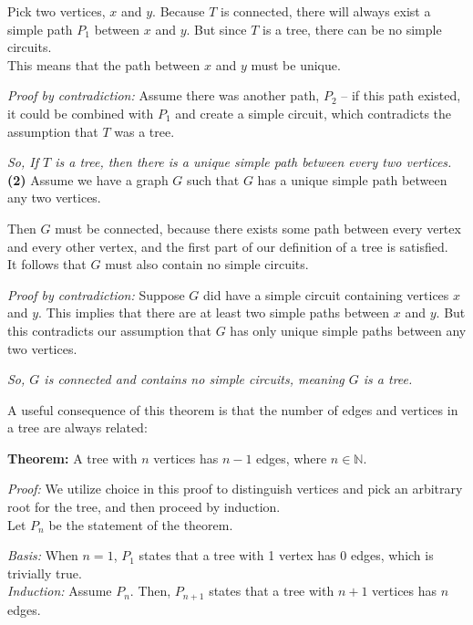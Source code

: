 \documentclass[a4paper,10pt]{report}
\begin{document}
Pick two vertices, $x$ and $y$.
Because $T$ is connected, there will always exist a simple path $P_1$ between $x$ and $y$.
But since $T$ is a tree, there can be no simple circuits. \\

This means that the path between $x$ and $y$ must be unique.

\textit{Proof by contradiction:}
Assume there was another path, $P_2$ -- if this path existed, it could be combined with $P_1$ and create a simple circuit, which contradicts the assumption that $T$ was a tree.

\textit{So, If $T$ is a tree, then there is a unique simple path between every two vertices.} \\

\textbf{(2)} Assume we have a graph $G$ such that $G$ has a unique simple path between any two vertices.

Then $G$ must be connected, because there exists some path between every vertex and every other vertex, and the first part of our definition of a tree is satisfied. \\

It follows that $G$ must also contain no simple circuits.

\textit{Proof by contradiction:}
Suppose $G$ did have a simple circuit containing vertices $x$ and $y$. This implies that there are at least two simple paths between $x$ and $y$. But this contradicts our assumption that $G$ has only unique simple paths between any two vertices.

\textit{So, $G$ is connected and contains no simple circuits, meaning $G$ is a tree.}

\hrulefill

A useful consequence of this theorem is that the number of edges and vertices in a tree are always related:

\textbf{Theorem:} A tree with $n$ vertices has $n-1$ edges, where $n\in\mathbb{N}$.

\textit{Proof: }We utilize choice in this proof to distinguish vertices and pick an arbitrary root for the tree, and then proceed by induction. \\

Let $P_n$ be the statement of the theorem.

\textit{Basis: }
When $n=1$, $P_1$ states that a tree with 1 vertex has 0 edges, which is trivially true. \\

\textit{Induction: }
Assume $P_n$. Then, $P_{n+1}$ states that a tree with $n+1$ vertices has $n$ edges.
\end{document}
